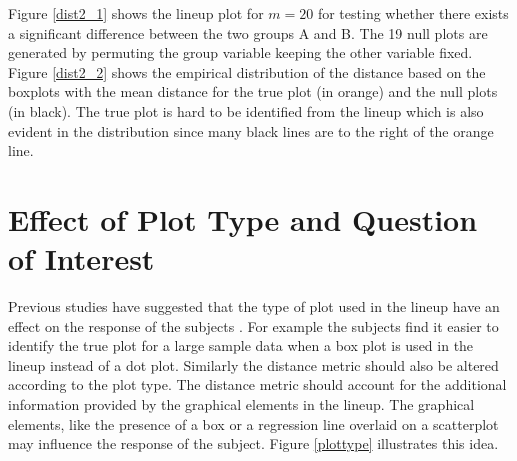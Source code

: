 \documentclass[12]{article}
\begin{document}
Figure \ref{dist2_1} shows the lineup plot for $m = 20$ for testing whether there exists a significant difference between the two groups A and B. The 19 null plots are generated by permuting the group variable keeping the other variable fixed. Figure \ref{dist2_2} shows the empirical distribution of the distance based on the boxplots with the mean distance for the true plot (in orange) and the null plots (in black). The true plot is hard to be identified from the lineup which is also evident in the distribution since many black lines are to the right of the orange line.

\section{Effect of Plot Type and Question of Interest } \label{sec:plot_type}

Previous studies have suggested that the type of plot used in the lineup have an effect on the response of the subjects \citep{zhao:2012}. For example the subjects find it easier to identify the true plot for a large sample data when a box plot is used in the lineup instead of a dot plot. Similarly the distance metric should also be altered according to the plot type. The distance metric should account for the additional information provided by the graphical elements in the lineup. The graphical elements, like the presence of a box or a regression line overlaid on a scatterplot may influence the response of the subject. Figure \ref{plottype} illustrates this idea. 
\end{document}

